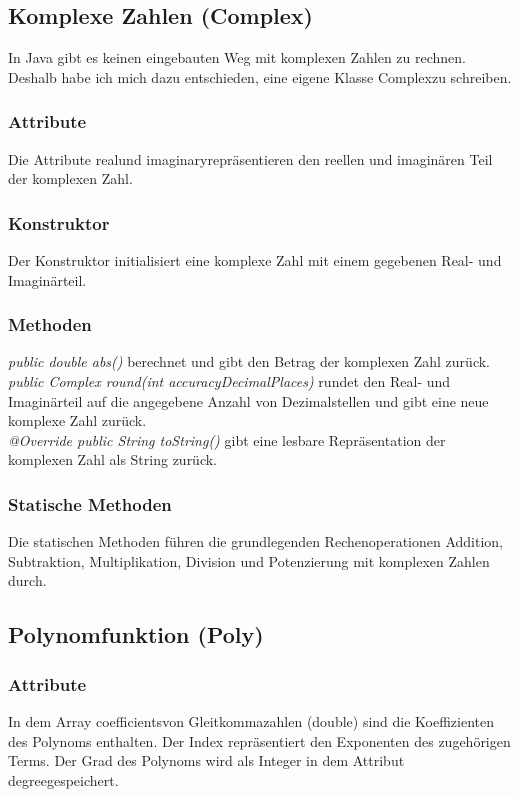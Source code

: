\documentclass[12pt]{article}
\begin{document}
\subsection{Komplexe Zahlen (Complex)}
In Java gibt es keinen eingebauten Weg mit komplexen Zahlen zu rechnen. Deshalb habe ich mich dazu entschieden, eine eigene Klasse \glqq Complex\grqq\space zu schreiben.

\subsubsection*{Attribute}
Die Attribute \glqq real\grqq\space und \glqq imaginary\grqq\space repräsentieren den reellen und imaginären Teil der komplexen Zahl.

\subsubsection*{Konstruktor}
Der Konstruktor initialisiert eine komplexe Zahl mit einem gegebenen Real- und Imaginärteil.

\subsubsection*{Methoden}
\textit{public double abs()} berechnet und gibt den Betrag der komplexen Zahl zurück.\\
\textit{public Complex round(int accuracyDecimalPlaces)} rundet den Real- und Imaginärteil auf die angegebene Anzahl von Dezimalstellen und gibt eine neue komplexe Zahl zurück.\\
\textit{@Override public String toString()} gibt eine lesbare Repräsentation der komplexen Zahl als String zurück.

\subsubsection*{Statische Methoden}
Die statischen Methoden führen die grundlegenden Rechenoperationen Addition, Subtraktion, Multiplikation, Division und Potenzierung mit komplexen Zahlen durch.

\subsection{Polynomfunktion (Poly)}

\subsubsection*{Attribute}
In dem Array \glqq coefficients\grqq\space von Gleitkommazahlen (double) sind die Koeffizienten des Polynoms enthalten. Der Index repräsentiert den Exponenten des zugehörigen Terms.
Der Grad des Polynoms wird als Integer in dem Attribut \glqq degree\grqq\space gespeichert. 
\end{document}
